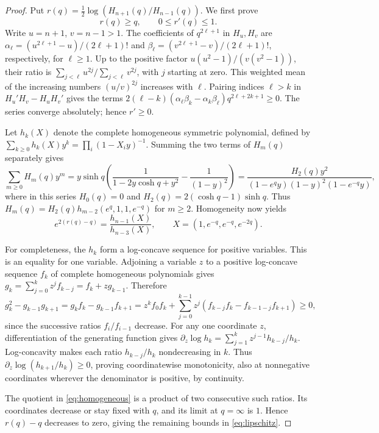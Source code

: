 \documentclass[10pt,twoside,reqno]{amsart}
\numberwithin{equation}{section}
\begin{document}
\begin{proof}
Put \(r(q)=\tfrac12\log(H_{n+1}(q)/H_{n-1}(q))\). We first prove
\begin{equation}\label{eq:lipschitz}
 r(q)\ge q,\qquad 0\le r'(q)\le1 .
\end{equation}
Write \(u=n+1\), \(v=n-1>1\). The coefficients of \(q^{2\ell+1}\) in
\(H_u,H_v\) are \(\alpha_\ell=(u^{2\ell+1}-u)/(2\ell+1)!\) and
\(\beta_\ell=(v^{2\ell+1}-v)/(2\ell+1)!\), respectively, for \(\ell\ge1\).
Up to the positive factor \(u(u^2-1)/(v(v^2-1))\), their ratio is
\(\sum_{j<\ell}u^{2j}/\sum_{j<\ell}v^{2j}\), with \(j\) starting at zero.
This weighted mean of the increasing numbers \((u/v)^{2j}\) increases with
\(\ell\). Pairing indices \(\ell>k\) in \(H_u'H_v-H_uH_v'\) gives the
terms \(2(\ell-k)(\alpha_\ell\beta_k-\alpha_k\beta_\ell)q^{2\ell+2k+1}\ge0\).
The series converge absolutely; hence \(r'\ge0\).

Let \(h_k(X)\) denote the complete homogeneous symmetric polynomial,
defined by \(\sum_{k\ge0}h_k(X)y^k=\prod_i(1-X_i y)^{-1}\).
Summing the two terms of \(H_m(q)\) separately gives
\[
 \sum_{m\ge0} H_m(q)y^m
 =y\sinh q\left(\frac1{1-2y\cosh q+y^2}-\frac1{(1-y)^2}\right)
 =\frac{H_2(q)y^2}{(1-e^q y)(1-y)^2(1-e^{-q}y)},
\]
where in this series \(H_0(q)=0\) and \(H_2(q)=2(\cosh q-1)\sinh q\).
Thus \(H_m(q)=H_2(q)h_{m-2}(e^q,1,1,e^{-q})\) for \(m\ge2\).
Homogeneity now yields
\begin{equation}\label{eq:homogeneous}
 e^{2(r(q)-q)}
 =\frac{h_{n-1}(X)}{h_{n-3}(X)},\qquad
 X=(1,e^{-q},e^{-q},e^{-2q}).
\end{equation}

For completeness, the \(h_k\) form a log-concave sequence for positive
variables. This is an equality for one variable. Adjoining a variable \(z\)
to a positive log-concave sequence \(f_k\) of complete homogeneous polynomials
gives \(g_k=\sum_{j=0}^k z^j f_{k-j}=f_k+zg_{k-1}\). Therefore
\[
 g_k^2-g_{k-1}g_{k+1}
 =g_k f_k-g_{k-1}f_{k+1}
 =z^k f_0f_k+\sum_{j=0}^{k-1}z^j(f_{k-j}f_k-f_{k-1-j}f_{k+1})\ge0,
\]
since the successive ratios \(f_i/f_{i-1}\) decrease.
For any one coordinate \(z\), differentiation of the generating function gives
\(\partial_z\log h_k=\sum_{j=1}^k z^{j-1}h_{k-j}/h_k\).
Log-concavity makes each ratio \(h_{k-j}/h_k\) nondecreasing in \(k\).
Thus \(\partial_z\log(h_{k+1}/h_k)\ge0\), proving coordinatewise
monotonicity, also at nonnegative coordinates wherever the denominator is
positive, by continuity.

The quotient in \eqref{eq:homogeneous} is a product of two consecutive such
ratios. Its coordinates decrease or stay fixed with \(q\), and its limit at
\(q=\infty\) is \(1\). Hence \(r(q)-q\) decreases to zero, giving the
remaining bounds in \eqref{eq:lipschitz}.


\end{proof}
\end{document}
